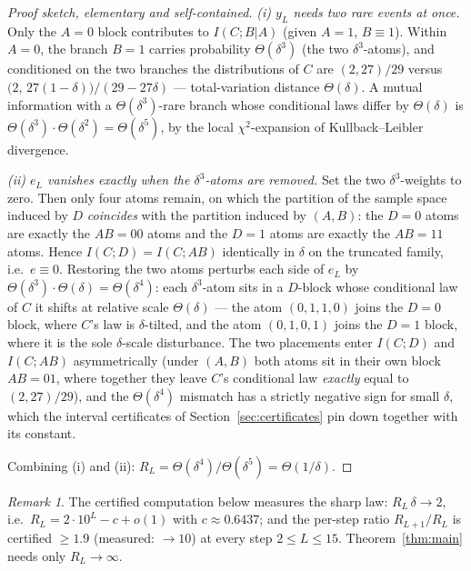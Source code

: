 \documentclass[11pt]{article}
\theoremstyle{remark}
\newtheorem{remark}[theorem]{Remark}
\newcommand{\I}{\mathrel{;}}
\begin{document}
\begin{proof}[Proof sketch, elementary and self-contained]
\emph{(i) $y_L$ needs two rare events at once.} Only the $A{=}0$ block contributes to
$I(C\I B|A)$ (given $A{=}1$, $B\equiv 1$). Within $A{=}0$, the branch $B{=}1$ carries
probability $\Theta(\delta^{3})$ (the two $\delta^3$-atoms), and conditioned on the two
branches the distributions of $C$ are $(2,27)/29$ versus
$\bigl(2,\,27(1-\delta)\bigr)/(29-27\delta)$ --- total-variation distance
$\Theta(\delta)$. A mutual information with a $\Theta(\delta^3)$-rare branch whose
conditional laws differ by $\Theta(\delta)$ is
$\Theta(\delta^{3})\cdot\Theta(\delta^{2}) = \Theta(\delta^{5})$, by the local
$\chi^2$-expansion of Kullback--Leibler divergence.

\emph{(ii) $e_L$ vanishes exactly when the $\delta^3$-atoms are removed.} Set the two
$\delta^{3}$-weights to zero. Then only four atoms remain, on which the partition of the
sample space induced by $D$ \emph{coincides} with the partition induced by $(A,B)$: the
$D{=}0$ atoms are exactly the $AB{=}00$ atoms and the $D{=}1$ atoms are exactly the
$AB{=}11$ atoms. Hence $I(C\I D)=I(C\I AB)$ identically in $\delta$ on the truncated
family, i.e.\ $e\equiv 0$. Restoring the two atoms perturbs each side of
$e_L$ by $\Theta(\delta^{3})\cdot\Theta(\delta)=\Theta(\delta^{4})$: each
$\delta^3$-atom sits in a $D$-block whose conditional law of $C$ it shifts at relative
scale $\Theta(\delta)$ --- the atom $(0,1,1,0)$ joins the $D{=}0$ block, where $C$'s law
is $\delta$-tilted, and the atom $(0,1,0,1)$ joins the $D{=}1$ block, where it is the
sole $\delta$-scale disturbance. The two placements enter $I(C\I D)$ and $I(C\I AB)$
asymmetrically (under $(A,B)$ both atoms sit in their own block $AB{=}01$, where together
they leave $C$'s conditional law \emph{exactly} equal to $(2,27)/29$), and the
$\Theta(\delta^4)$ mismatch has a strictly negative sign for small $\delta$, which the
interval certificates of Section~\ref{sec:certificates} pin down together with its
constant.

Combining (i) and (ii): $R_L = \Theta(\delta^{4})/\Theta(\delta^{5}) =
\Theta(1/\delta)$.
\end{proof}

\begin{remark}
The certified computation below measures the sharp law: $R_L\,\delta \to 2$, i.e.\
$R_L = 2\cdot 10^{L} - c + o(1)$ with $c \approx 0.6437$; and the per-step ratio
$R_{L+1}/R_L$ is certified $\ge 1.9$ (measured: $\to 10$) at every step $2\le L\le 15$.
Theorem~\ref{thm:main} needs only $R_L\to\infty$.
\end{remark}
\end{document}
